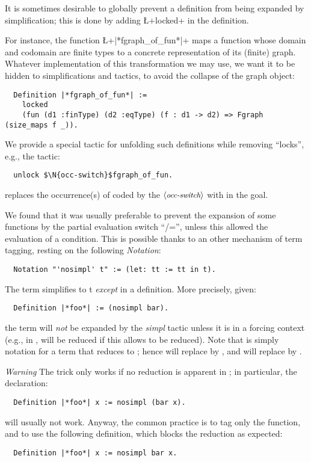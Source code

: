 It is sometimes desirable to globally prevent a definition from being
expanded by simplification; this is done by adding \L+locked+ in the
definition.

For instance, the function \L+|*fgraph_of_fun*|+ maps a function whose
domain and codomain are finite types to a concrete representation of
its (finite) graph. Whatever implementation of this transformation we
may use, we want it to be hidden to simplifications and tactics, to
avoid the collapse of the graph object:
\begin{lstlisting}
  Definition |*fgraph_of_fun*| :=
    locked
    (fun (d1 :finType) (d2 :eqType) (f : d1 -> d2) => Fgraph (size_maps f _)).
\end{lstlisting}

We provide a special tactic  for unfolding such definitions
while removing ``locks'', e.g., the tactic:
\begin{lstlisting}
  unlock $\N{occ-switch}$fgraph_of_fun.
\end{lstlisting}
replaces the occurrence(s) of  coded by the $\langle\mbox{\itshape\rmfamily\small occ-switch}\rangle$
with  in the goal.

We found that it was usually preferable to prevent the expansion of
some functions by the partial evaluation switch ``/='', unless
this allowed the evaluation of a condition. This is possible thanks to
an other mechanism of term tagging, resting on the following
\emph{Notation}:
\begin{lstlisting}
  Notation "'nosimpl' t" := (let: tt := tt in t).
\end{lstlisting}

The term  simplifies to t \emph{except} in a
definition. More precisely,
given:
\begin{lstlisting}
  Definition |*foo*| := (nosimpl bar).
\end{lstlisting}
the term  will \emph{not} be expanded by the
\emph{simpl} tactic unless it is in a forcing context (e.g., in
,  will be reduced if this allows
 to be reduced). Note that  is simply notation
for a term that reduces to ; hence  will replace
     by , and  will replace  by
    .

\emph{Warning} The  trick only works if no reduction is
apparent in ; in particular, the declaration:
\begin{lstlisting}
  Definition |*foo*| x := nosimpl (bar x).
\end{lstlisting}
will usually not work. Anyway, the common practice is to tag only the
function, and to use the following definition, which blocks the
reduction as expected:
\begin{lstlisting}
  Definition |*foo*| x := nosimpl bar x.
\end{lstlisting}


